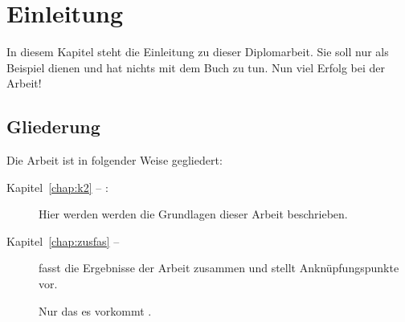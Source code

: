 
\chapter{Einleitung}
In diesem Kapitel steht die Einleitung zu dieser Diplomarbeit. Sie soll nur als Beispiel dienen und hat nichts mit dem Buch \cite{WSPA} zu tun. Nun viel Erfolg bei der Arbeit!

\section*{Gliederung}
Die Arbeit ist in folgender Weise gegliedert:
\begin{description}
\item[Kapitel~\ref{chap:k2} -- :] Hier werden werden die Grundlagen dieser Arbeit beschrieben.
\item[Kapitel~\ref{chap:zusfas} -- ] fasst die Ergebnisse der Arbeit zusammen und stellt Anknüpfungspunkte vor.

Nur das es vorkommt \cite{WSPA}.
\end{description}

